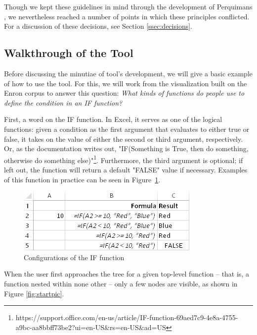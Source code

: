 \documentclass[conference]{IEEEtran}
\newcommand{\toolname}{Perquimans } \newcommand{\toolnameend}{Perquimans}
\begin{document}
	Though we kept these guidelines in mind through the development of \toolname,
	we nevertheless reached a number of points in which these principles
	conflicted. For a discussion of these decisions, see Section
	\ref{ssec:decisions}.
	
	\subsection{Walkthrough of the Tool} \label{sec:walkthrough}Before discussing
	the minutiae of tool's development, we will give a basic example of how to use
	the tool. For this, we will work from the visualization built on the Enron
	corpus to answer this question: \textit{ What kinds of functions do people use
		to define the condition in an IF function?} \par
	
	First, a word on the IF function. In Excel, it serves as one of the logical
	functions: given a condition as the first argument that evaluates to either
	true or false, it takes on the value of either the second or third argument,
	respectively. Or, as the documentation writes out, "IF(Something is True, then
	do something, otherwise do something
	else)"\footnote{https://support.office.com/en-us/article/IF-function-69aed7c9-4e8a-4755-a9bc-aa8bbff73be2?ui=en-US\&rs=en-US\&ad=US}. Furthermore, the third argument is optional; if left out, the function will return a default "FALSE" value if necessary. Examples of this function in practice can be seen in Figure~\ref{fig:ifexample}.
	
	\begin{figure}[h] \centering \includegraphics[scale=.9]{ifExample}
		\caption{Configurations of the IF function} \label{fig:ifexample} \end{figure}
	
	When the user first approaches the tree for a given top-level function -- that
	is, a function nested within none other -- only a few nodes are visible, as
	shown in Figure \ref{fig:startpic}. \par
	
\end{document}
